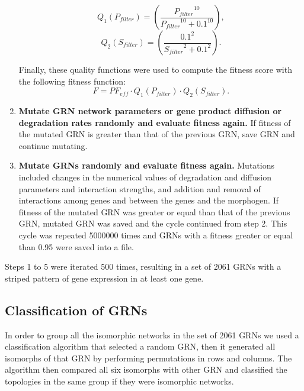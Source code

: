 \documentclass[10pt,letterpaper]{article}
\begin{document}
\begin{enumerate}
 \begin{equation}
  Q_1(P_{filter}) = \left( \frac{ {P_{filter}}^{10} }{ {P_{filter}}^{10} +
  0.1^{10} } \right),
 \end{equation}
 \begin{equation}
  Q_2(S_{filter}) = \left( \frac{ 0.1^2 }{ {S_{filter}}^2 + 0.1^2 } \right).
 \end{equation}

 Finally, these quality functions were used to compute the fitness score with
 the following fitness function:
 \begin{equation}
  F = \mathit{PF_{eff}} \cdot Q_1(P_{filter}) \cdot Q_2(S_{filter}).
 \end{equation}

 \item{\bf Mutate GRN network parameters or gene product diffusion or
degradation rates randomly and evaluate fitness again.} If fitness of the
mutated GRN is greater than that of the previous GRN, save GRN and continue
mutating.

 \item {\bf Mutate GRNs randomly and evaluate fitness again.} Mutations
included changes in the  numerical values of degradation and diffusion
parameters and interaction strengths, and addition and removal of interactions
among genes and between the genes and the morphogen. If fitness of the mutated
GRN was greater or equal than that of the previous GRN, mutated GRN was saved
and the cycle continued from step 2. This cycle was repeated 5000000 times and
GRNs with a fitness greater or equal than 0.95 were saved into a file.

\end{enumerate}

Steps 1 to 5 were iterated 500 times, resulting in a set of 2061 GRNs with a
striped pattern of gene expression in at least one gene.

\subsection*{Classification of GRNs}

In order to group all the isomorphic networks in the set of 2061 GRNs we used a
classification algorithm that selected a random GRN, then it generated all
isomorphs of that GRN by performing permutations in rows and columns. The
algorithm then compared all six isomorphs with other GRN and classified the
topologies in the same group if they were isomorphic networks.
\end{document}
